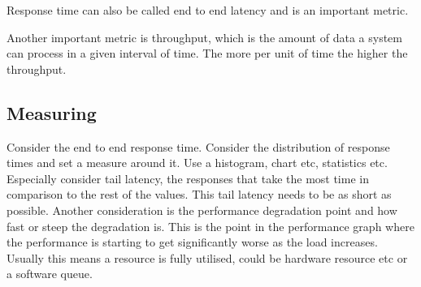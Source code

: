 \documentclass[a4paper, 11pt]{book}
\begin{document}
    Response time can also be called end to end latency and is an important metric.

    Another important metric is throughput, which is the amount of data a system can process in a given interval of time.
    The more per unit of time the higher the throughput.

    \subsection{Measuring}
    Consider the end to end response time.
    Consider the distribution of response times and set a measure around it.
    Use a histogram, chart etc, statistics etc.
    Especially consider tail latency, the responses that take the most time in comparison to the rest of the values.
    This tail latency needs to be as short as possible.
    Another consideration is the performance degradation point and how fast or steep the degradation is.
    This is the point in the performance graph where the performance is starting to get significantly worse as the load increases.
    Usually this means a resource is fully utilised, could be hardware resource etc or a software queue.
\end{document}
